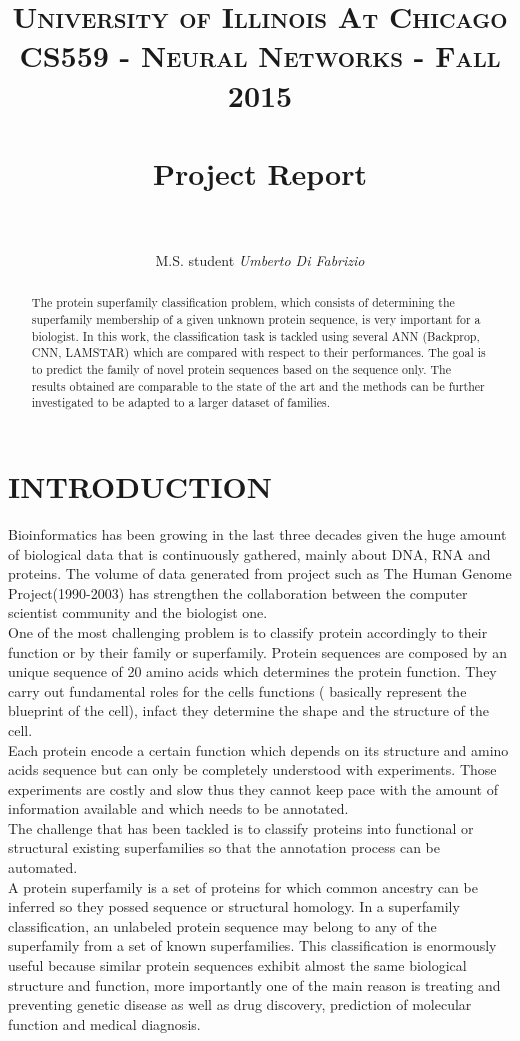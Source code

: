 \documentclass[a4paper, 10pt, conference]{ieeeconf}      %
\title{
		\usefont{OT1}{bch}{b}{n}
		\normalfont \normalsize \textsc{University of Illinois At Chicago\\CS559 - Neural Networks - Fall 2015} \\ [25pt]
		\horrule{2pt} \\[0.4cm]
		\huge Project Report \\
		\horrule{2pt} \\[0.3cm]
}
\author{
		\normalfont 								\large
        M.S. student \textit{Umberto Di Fabrizio}\\		\normalsize
}
\date{}
\begin{document}
\maketitle
\thispagestyle{empty}
\pagestyle{empty}


\begin{abstract}
The protein superfamily classification problem, which consists of determining the superfamily membership
of a given unknown protein sequence, is very important for a biologist. In this work, the classification task is tackled using several ANN (Backprop, CNN, LAMSTAR) which are compared with respect to their performances. The goal
is to predict the family of novel protein sequences based on the sequence only. The results obtained are comparable to the state of the art and the methods can be further investigated to be adapted to a larger dataset of families.
\end{abstract}
\section{INTRODUCTION}
Bioinformatics has been growing in the last three decades\cite{Efficient} given the huge amount of biological data that is continuously gathered, mainly about DNA, RNA and proteins. The volume of data generated from project such as The Human Genome Project\cite{human}(1990-2003) has strengthen the collaboration between the computer scientist community and the biologist one.\\
One of the most challenging problem is to classify protein accordingly to their function or by their family or superfamily. Protein sequences are composed by an unique sequence of 20 amino acids which determines the protein function. They carry out fundamental roles for the cells functions ( basically represent the blueprint of the cell), infact they determine the shape and the structure of the cell.\\ Each protein encode a certain function which depends on its structure and amino acids sequence but can only be completely understood with experiments. Those experiments are costly and slow thus they cannot keep pace with the amount of information available and which needs to be annotated.\\
The challenge that has been tackled is to classify proteins into functional or structural existing superfamilies so that the annotation process can be automated. \\  
A protein superfamily is a set of proteins for which common ancestry can be inferred so they possed sequence or structural homology. 
In a superfamily classification, an unlabeled protein sequence may belong
to any of the superfamily from a set of known superfamilies. This classification is enormously useful because similar protein sequences exhibit almost the same biological structure and function, more importantly one of the main reason is treating and preventing genetic disease as well as drug discovery, prediction of molecular function and medical diagnosis.
\end{document}
